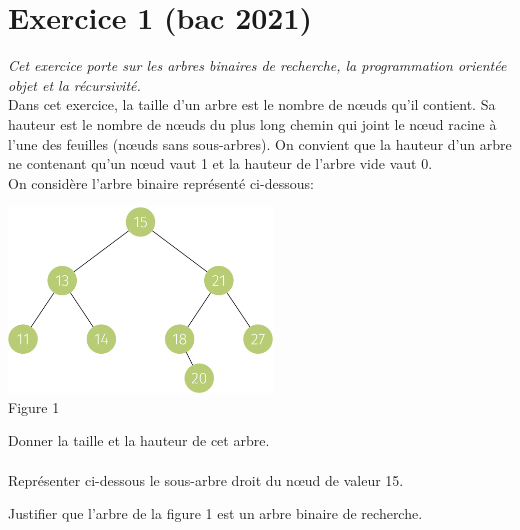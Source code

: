 \documentclass[a4paper,12pt,eval,firamath]{nsi}
\begin{document}
\maketitle

\section*{Exercice 1 \small (bac 2021)}
\resetquestion
\textit{Cet exercice porte sur les arbres binaires de recherche, la programmation orientée
      objet et la récursivité.}\\

Dans cet exercice, la taille d'un arbre est le nombre de nœuds qu'il contient. Sa hauteur
est le nombre de nœuds du plus long chemin qui joint le nœud racine à l'une des
feuilles (nœuds sans sous-arbres). On convient que la hauteur d'un arbre ne contenant
qu'un nœud vaut 1 et la hauteur de l'arbre vide vaut 0.\\

On considère l'arbre binaire représenté ci-dessous:
\begin{center}
      \includegraphics[width=7cm]{img/fig1.png}\\
      Figure 1
\end{center}
Donner la taille et la hauteur de cet arbre.\\

\\

\question Représenter ci-dessous le sous-arbre droit du n\oe ud de valeur 15.\\


\question Justifier que l'arbre de la figure 1 est un arbre binaire de recherche.\\

\\
\end{document}
